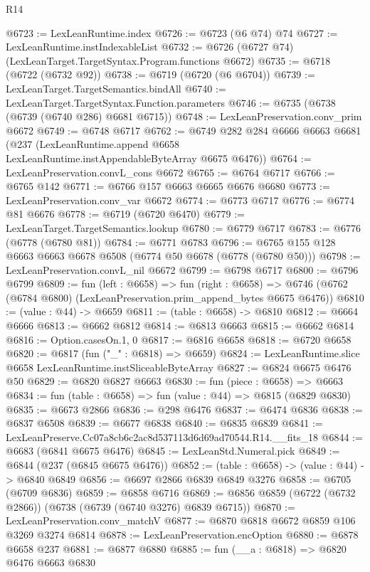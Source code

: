 \begin{lexlean}{R14}
\begin{coremodule}
@6723 := LexLeanRuntime.index
@6726 := @6723 (@6 @74) @74
@6727 := LexLeanRuntime.instIndexableList
@6732 := @6726 (@6727 @74) (LexLeanTarget.TargetSyntax.Program.functions @6672)
@6735 := @6718 (@6722 (@6732 @92))
@6738 := @6719 (@6720 (@6 @6704))
@6739 := LexLeanTarget.TargetSemantics.bindAll
@6740 := LexLeanTarget.TargetSyntax.Function.parameters
@6746 := @6735 (@6738 (@6739 (@6740 @286) @6681 @6715))
@6748 := LexLeanPreservation.conv_prim @6672
@6749 := @6748 @6717
@6762 := @6749
    @282
    @284
    @6666
    @6663
    @6681
    (@237 (LexLeanRuntime.append @6658 LexLeanRuntime.instAppendableByteArray @6675 @6476))
@6764 := LexLeanPreservation.convL_cons @6672
@6765 := @6764 @6717
@6766 := @6765 @142
@6771 := @6766 @157 @6663 @6665 @6676 @6680
@6773 := LexLeanPreservation.conv_var @6672
@6774 := @6773 @6717
@6776 := @6774 @81 @6676
@6778 := @6719 (@6720 @6470)
@6779 := LexLeanTarget.TargetSemantics.lookup
@6780 := @6779 @6717
@6783 := @6776 (@6778 (@6780 @81))
@6784 := @6771 @6783
@6796 := @6765 @155 @128 @6663 @6663 @6678 @6508 (@6774 @50 @6678 (@6778 (@6780 @50)))
@6798 := LexLeanPreservation.convL_nil @6672
@6799 := @6798 @6717
@6800 := @6796 @6799
@6809 := fun (left : @6658) =>
  fun (right : @6658) =>
  @6746 (@6762 (@6784 @6800) (LexLeanPreservation.prim_append_bytes @6675 @6476))
@6810 := (value : @44) -> @6659
@6811 := (table : @6658) -> @6810
@6812 := @6664 @6666
@6813 := @6662 @6812
@6814 := @6813 @6663
@6815 := @6662 @6814
@6816 := Option.casesOn.{1, 0}
@6817 := @6816 @6658
@6818 := @6720 @6658
@6820 := @6817 (fun ("_" : @6818) => @6659)
@6824 := LexLeanRuntime.slice @6658 LexLeanRuntime.instSliceableByteArray
@6827 := @6824 @6675 @6476 @50
@6829 := @6820 @6827 @6663
@6830 := fun (piece : @6658) => @6663
@6834 := fun (table : @6658) => fun (value : @44) => @6815 (@6829 @6830)
@6835 := @6673 @2866
@6836 := @298 @6476
@6837 := @6474 @6836
@6838 := @6837 @6508
@6839 := @6677 @6838
@6840 := @6835 @6839
@6841 := LexLeanPreserve.Cc07a8cb6c2ac8d537113d6d69ad70544.R14.__fits_18
@6844 := @6683 (@6841 @6675 @6476)
@6845 := LexLeanStd.Numeral.pick
@6849 := @6844 (@237 (@6845 @6675 @6476))
@6852 := (table : @6658) -> (value : @44) -> @6840 @6849
@6856 := @6697 @2866 @6839 @6849 @3276
@6858 := @6705 (@6709 @6836)
@6859 := @6858 @6716
@6869 := @6856 @6859 (@6722 (@6732 @2866)) (@6738 (@6739 (@6740 @3276) @6839 @6715))
@6870 := LexLeanPreservation.conv_matchV
@6877 := @6870 @6818 @6672 @6859 @106 @3269 @3274 @6814
@6878 := LexLeanPreservation.encOption
@6880 := @6878 @6658 @237
@6881 := @6877 @6880
@6885 := fun (__a : @6818) => @6820 @6476 @6663 @6830

\end{coremodule}
\end{lexlean}
